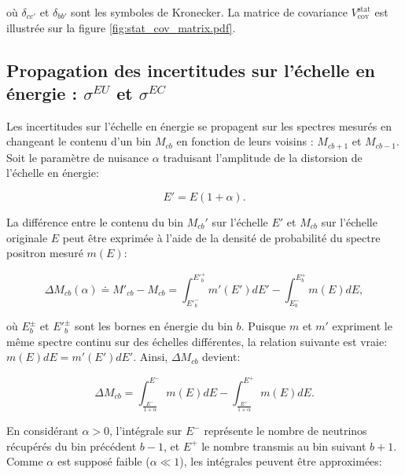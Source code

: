 \bigbreak

où $\delta_{cc'}$ et $\delta_{bb'}$ sont les symboles de Kronecker. La matrice de covariance $V_\textrm{cov}^\textrm{stat}$ est illustrée sur la figure \ref{fig:stat_cov_matrix.pdf}.

\bigbreak

\subsection{Propagation des incertitudes sur l'échelle en énergie : $\sigma^{EU}$ et $\sigma^{EC}$}
\label{sec:Escal_propagation_linear_for_chi2}

Les incertitudes sur l'échelle en énergie se propagent sur les spectres mesurés en changeant le contenu d'un bin $M_{cb}$ en fonction de leurs voisins : $M_{cb+1}$ et $M_{cb-1}$. Soit le paramètre de nuisance $\alpha$ traduisant l'amplitude de la distorsion de l'échelle en énergie:

\begin{equation}
\label{eq:escale_distorsion_firstorder}
    E' = E(1 + \alpha ).
\end{equation}

\bigbreak

La différence entre le contenu du bin $M_{cb}'$ sur l'échelle $E'$ et $M_{cb}$ sur l'échelle originale $E$ peut être exprimée à l'aide de la densité de probabilité du spectre positron mesuré $m(E)$:

\begin{equation}
    \Delta M_{cb}(\alpha) \doteq M'_{cb} - M_{cb} = \int_{E'^-_b}^{E'^+_b} m'(E')dE' - \int_{E^-_b}^{E^+_b} m(E)dE,
\end{equation}

où $E^{\pm}_b$ et $E'^{\pm}_b$ sont les bornes en énergie du bin $b$. Puisque $m$ et $m'$ expriment le même spectre continu sur des échelles différentes, la relation suivante est vraie: $m(E)dE = m'(E')dE'$. Ainsi, $\Delta M_{cb}$ devient:

\begin{equation}
    \Delta M_{cb} = \int_{\frac{E^-}{1+\alpha}}^{E^-} m(E)dE - \int_{\frac{E^+}{1+\alpha}}^{E^+} m(E)dE.
\end{equation}

\bigbreak

En considérant $\alpha > 0$, l'intégrale sur $E^-$ représente le nombre de neutrinos récupérés du bin précédent $b-1$, et $E^+$ le nombre transmis au bin suivant $b+1$. Comme $\alpha$ est supposé faible ($\alpha \ll 1$), les intégrales peuvent être approximées:

